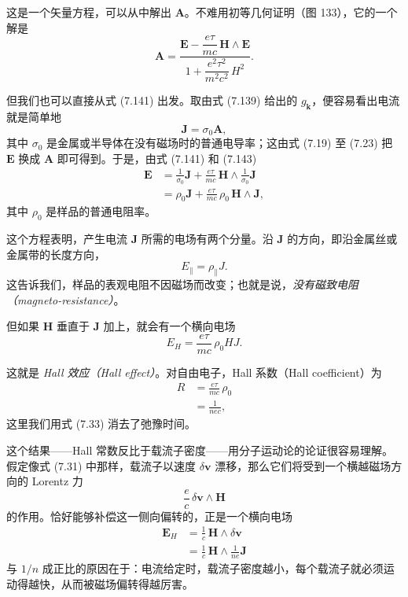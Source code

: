 这是一个矢量方程，可以从中解出 $\mathbf{A}$。不难用初等几何证明（图 133），它的一个解是
\begin{equation*}
\mathbf{A}=\frac{\mathbf{E}-\dfrac{e\tau}{mc}\,\mathbf{H}\wedge\mathbf{E}}{1+\dfrac{e^{2}\tau^{2}}{m^{2}c^{2}}\,H^{2}}.\tag{7.142}
\end{equation*}

但我们也可以直接从式 (7.141) 出发。取由式 (7.139) 给出的 $g_{\mathbf{k}}$，便容易看出电流就是简单地
\begin{equation*}
\mathbf{J}=\sigma_{0}\mathbf{A},\tag{7.143}
\end{equation*}
其中 $\sigma_{0}$ 是金属或半导体在没有磁场时的普通电导率；这由式 (7.19) 至 (7.23) 把 $\mathbf{E}$ 换成 $\mathbf{A}$ 即可得到。于是，由式 (7.141) 和 (7.143)
\begin{align*}
\mathbf{E}&=\frac{1}{\sigma_{0}}\mathbf{J}+\frac{e\tau}{mc}\,\mathbf{H}\wedge\frac{1}{\sigma_{0}}\mathbf{J}\\
&=\rho_{0}\mathbf{J}+\frac{e\tau}{mc}\,\rho_{0}\,\mathbf{H}\wedge\mathbf{J},\tag{7.144}
\end{align*}
其中 $\rho_{0}$ 是样品的普通电阻率。

这个方程表明，产生电流 $\mathbf{J}$ 所需的电场有两个分量。沿 $\mathbf{J}$ 的方向，即沿金属丝或金属带的长度方向，
\begin{equation*}
E_{\parallel}=\rho_{\parallel}J.\tag{7.145}
\end{equation*}
这告诉我们，样品的表观电阻不因磁场而改变；也就是说，\emph{没有磁致电阻（magneto-resistance）}。

但如果 $\mathbf{H}$ 垂直于 $\mathbf{J}$ 加上，就会有一个横向电场
\begin{equation*}
E_{H}=\frac{e\tau}{mc}\,\rho_{0}HJ.\tag{7.146}
\end{equation*}

这就是 \emph{Hall 效应（Hall effect）}。对自由电子，Hall 系数（Hall coefficient）为
\begin{align*}
R&=\frac{e\tau}{mc}\,\rho_{0}\\
&=\frac{1}{nec},\tag{7.147}
\end{align*}
这里我们用式 (7.33) 消去了弛豫时间。

这个结果——Hall 常数反比于载流子密度——用分子运动论的论证很容易理解。假定像式 (7.31) 中那样，载流子以速度 $\delta\mathbf{v}$ 漂移，那么它们将受到一个横越磁场方向的 Lorentz 力
\begin{equation*}
\frac{e}{c}\,\delta\mathbf{v}\wedge\mathbf{H}\tag{7.148}
\end{equation*}
的作用。恰好能够补偿这一侧向偏转的，正是一个横向电场
\begin{align*}
\mathbf{E}_{H}&=\frac{1}{c}\,\mathbf{H}\wedge\delta\mathbf{v}\\
&=\frac{1}{c}\,\mathbf{H}\wedge\frac{1}{ne}\mathbf{J}\tag{7.149}
\end{align*}
与 $1/n$ 成正比的原因在于：电流给定时，载流子密度越小，每个载流子就必须运动得越快，从而被磁场偏转得越厉害。

